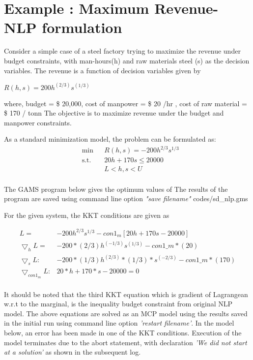 \documentclass{article}
\begin{document}
\section{Example : Maximum Revenue- NLP formulation}

Consider a simple case of a steel factory trying to maximize the revenue under budget constraints, with man-hours(h) and
raw materials steel (s) as the decision variables. The revenue is a function of decision variables given by

\centerline{$R(h,s) = 200 h^{(2/3)}s^{(1/3)} $ }
\bigbreak
\noindent where, budget = \$ 20,000, cost of manpower = \$ 20 /hr , cost of raw material = \$ 170 / tonn
The objective is to maximize revenue under the budget and manpower constraints.

\noindent As a standard minimization model, the problem can be formulated as:
\begin{equation}
\begin{aligned}
&	\min
& & R(h,s) = - 200 h^{2/3}s^{1/3}  \\
& \text{s.t.} & & 	 20h + 170s \leq 20000 \\
& & &			L< h,s < U   \\
\end{aligned}
\end{equation}

The GAMS program below gives the optimum values of 
The results of the program are saved using command line option \textit{"save filename"}
 {codes/sd_nlp.gms}

\noindent For the given system, the KKT conditions are given as

\begin{equation}
\begin{aligned}
 L = & - 200 h^{2/3}s^{1/3} - con1_m [ 20h + 170 s - 20000]	\\
 \bigtriangledown _h L = & - 200* (2/3) h^{(-1/3)}  s^{(1/3)} - con1\_m*(20)  	\\
 \bigtriangledown _s L:  & - 200 * (1 / 3) h^{(2/3)} *(1/3) *  s^{(-2/3)} - con1\_m*(170)   \\
 \bigtriangledown _{con1_m} L : &   20*h + 170 * s - 20000 =0 \\
\end{aligned}
\end{equation}

\noindent It should be noted that the third KKT equation which is gradient of Lagrangean w.r.t to the marginal, is the inequality budget
constraint from original NLP model. The above equations are solved as an MCP model using the results saved in the initial run using command line
option \textit{'restart filename'}.
In the model below, an error has been made in one of the KKT conditions. Execution of the model terminates due to the abort statement,
with declaration \textit{'We did not start at a solution'} as shown in the subsequent log.
\end{document}
